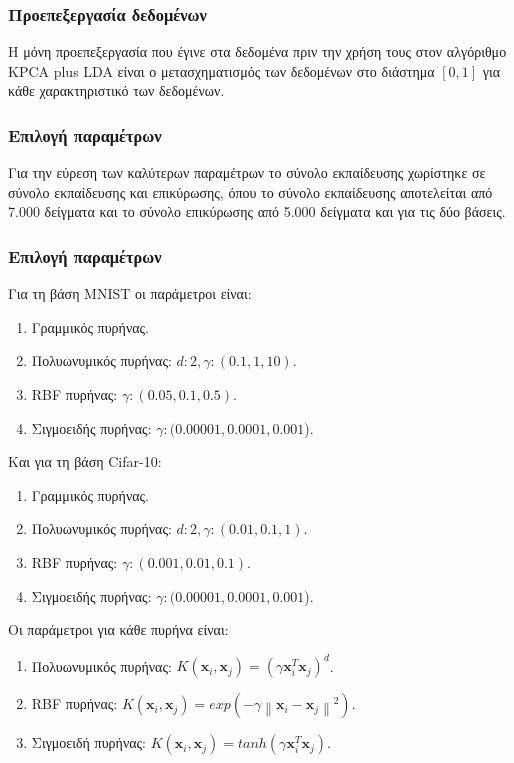 \documentclass{beamer}
\newcommand\norm[1]{\left\lVert#1\right\rVert}
\begin{document}
\begin{frame}
\frametitle{Προεπεξεργασία δεδομένων}

Η μόνη προεπεξεργασία που έγινε στα δεδομένα πριν την χρήση τους στον αλγόριθμο
KPCA plus LDA είναι ο μετασχηματισμός των δεδομένων στο διάστημα $[0,1]$ για
κάθε χαρακτηριστικό των δεδομένων.

\end{frame}

\begin{frame}
\frametitle{Επιλογή παραμέτρων}

Για την εύρεση των καλύτερων παραμέτρων το σύνολο εκπαίδευσης χωρίστηκε σε
σύνολο εκπαίδευσης και επικύρωσης, όπου το σύνολο εκπαίδευσης αποτελείται από
7.000 δείγματα και το σύνολο επικύρωσης από 5.000 δείγματα και για τις δύο
βάσεις.

\end{frame}

\begin{frame}
\frametitle{Επιλογή παραμέτρων}

Για τη βάση MNIST οι παράμετροι είναι:

\begin{enumerate}
    \item Γραμμικός πυρήνας.
    \item Πολυωνυμικός πυρήνας: $d: 2, \gamma: (0.1, 1, 10)$.
    \item RBF πυρήνας: $\gamma: (0.05, 0.1, 0.5)$.
    \item Σιγμοειδής πυρήνας: $\gamma: (0.00001, 0.0001, 0.001$).
\end{enumerate} \pause

Και για τη βάση Cifar-10:

\begin{enumerate}
    \item Γραμμικός πυρήνας.
    \item Πολυωνυμικός πυρήνας: $d: 2, \gamma: (0.01, 0.1, 1)$.
    \item RBF πυρήνας: $\gamma: (0.001, 0.01, 0.1)$.
    \item Σιγμοειδής πυρήνας: $\gamma: (0.00001, 0.0001, 0.001$).
\end{enumerate} \pause

Οι παράμετροι για κάθε πυρήνα είναι:

\begin{enumerate}
    \item Πολυωνυμικός πυρήνας: $K(\bm{x}_i,\bm{x}_j) = (\gamma \bm{x}_i^T
        \bm{x}_j)^d$.
    \item RBF πυρήνας: $K(\bm{x}_i,\bm{x}_j) = exp(-\gamma \norm{\bm{x}_i -
        \bm{x}_j}^2)$.
    \item Σιγμοειδή πυρήνας: $K(\bm{x}_i,\bm{x}_j) = tanh(\gamma \bm{x}_i^T
        \bm{x}_j)$.
\end{enumerate}

\end{frame}
\end{document}

